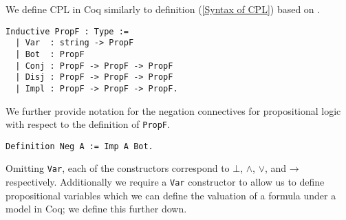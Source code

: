 \documentclass{llncs}
\newcommand*\lif{\mathbin{\to}}
\begin{document}
We define CPL in Coq similarly to definition (\ref{Syntax of CPL}) based on
\cite{van2015propositional}.
%
\begin{verbatim}
Inductive PropF : Type :=
  | Var  : string -> PropF
  | Bot  : PropF
  | Conj : PropF -> PropF -> PropF
  | Disj : PropF -> PropF -> PropF
  | Impl : PropF -> PropF -> PropF.
\end{verbatim}
%
We further provide notation for the negation connectives for propositional
logic with respect to the definition of \verb+PropF+.
%
\begin{verbatim}
Definition Neg A := Imp A Bot.
\end{verbatim}
%
Omitting \verb+Var+, each of the constructors correspond to $\bot$, $\land$,
$\lor$, and $\lif$ respectively. Additionally we require a \verb+Var+
constructor to allow us to define propositional variables which we can define
the valuation of a formula under a model in Coq; we define this further down.
\end{document}
